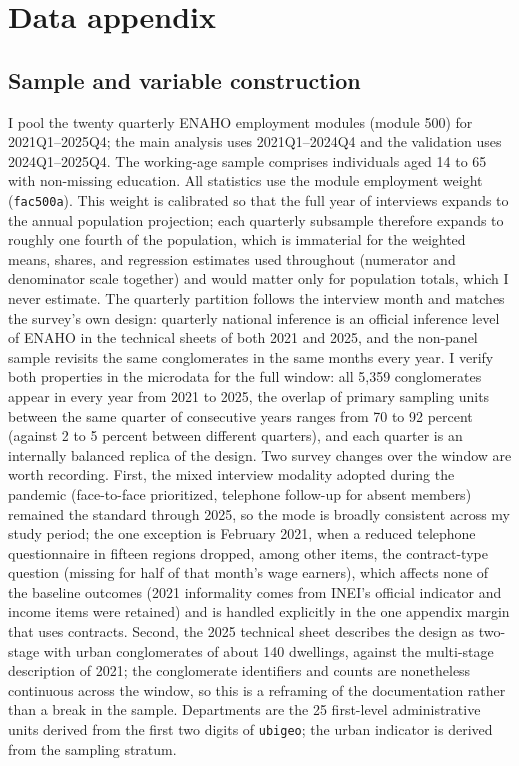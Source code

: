 \section{Data appendix}\label{app:data}

\subsection{Sample and variable construction}

I pool the twenty quarterly ENAHO employment modules (module 500) for 2021Q1--2025Q4; the main analysis uses 2021Q1--2024Q4 and the validation uses 2024Q1--2025Q4. The working-age sample comprises individuals aged 14 to 65 with non-missing education. All statistics use the module employment weight (\texttt{fac500a}). This weight is calibrated so that the full year of interviews expands to the annual population projection; each quarterly subsample therefore expands to roughly one fourth of the population, which is immaterial for the weighted means, shares, and regression estimates used throughout (numerator and denominator scale together) and would matter only for population totals, which I never estimate. The quarterly partition follows the interview month and matches the survey's own design: quarterly national inference is an official inference level of ENAHO in the technical sheets of both 2021 and 2025, and the non-panel sample revisits the same conglomerates in the same months every year. I verify both properties in the microdata for the full window: all 5{,}359 conglomerates appear in every year from 2021 to 2025, the overlap of primary sampling units between the same quarter of consecutive years ranges from 70 to 92 percent (against 2 to 5 percent between different quarters), and each quarter is an internally balanced replica of the design. Two survey changes over the window are worth recording. First, the mixed interview modality adopted during the pandemic (face-to-face prioritized, telephone follow-up for absent members) remained the standard through 2025, so the mode is broadly consistent across my study period; the one exception is February 2021, when a reduced telephone questionnaire in fifteen regions dropped, among other items, the contract-type question (missing for half of that month's wage earners), which affects none of the baseline outcomes (2021 informality comes from INEI's official indicator and income items were retained) and is handled explicitly in the one appendix margin that uses contracts. Second, the 2025 technical sheet describes the design as two-stage with urban conglomerates of about 140 dwellings, against the multi-stage description of 2021; the conglomerate identifiers and counts are nonetheless continuous across the window, so this is a reframing of the documentation rather than a break in the sample. Departments are the 25 first-level administrative units derived from the first two digits of \texttt{ubigeo}; the urban indicator is derived from the sampling stratum.


